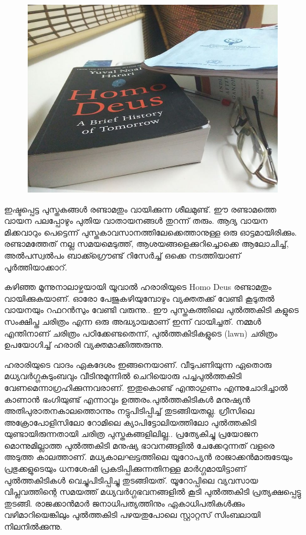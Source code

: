 \documentclass[10pt,a4paper]{report}
\begin{document}
   \begin{figure}[H]
  \center
\includegraphics[scale=.25]{images/harari}
\label{harari}
\caption{   }
\end{figure}
  ഇഷ്ടപ്പെട്ട പുസ്തകങ്ങള്‍ രണ്ടാമതും വായിക്കുന്ന ശീലമുണ്ട്. ഈ രണ്ടാമത്തെ വായന പലപ്പോഴും പുതിയ വാതായനങ്ങള്‍ തുറന്ന് തരും. ആദ്യ വായന മിക്കവാറും പെട്ടെന്ന് പുസ്തകാവസാനത്തിലേക്കെത്താനുള്ള ഒരു ഓട്ടമായിരിക്കും. രണ്ടാമത്തേത് നല്ല സമയമെടുത്ത്, ആശയങ്ങളെക്കുറിച്ചൊക്കെ ആലോചിച്ച്, അല്‍പസ്വല്‍പം ബാക്ക്ഗ്രൌണ്ട് റിസേര്‍ച്ച് ഒക്കെ നടത്തിയാണ് പൂര്‍ത്തിയാക്കാറ്. 
  
  കഴിഞ്ഞ മൂന്നുനാലാഴ്ചയായി യൂവാല്‍ ഹരാരിയുടെ Homo Deus രണ്ടാമതും വായിക്കുകയാണ്. ഓരോ പേജുകഴിയുമ്പോഴും വ്യക്തതക്ക് വേണ്ടി കൂടുതല്‍ വായനയും റഫറന്‍സും വേണ്ടി വരുന്നു.. ഈ പുസ്തകത്തിലെ പുൽത്തകിടി കളുടെ സംക്ഷിപ്ത ചരിത്രം എന്ന ഒരു അദ്ധ്യായമാണ് ഇന്ന് വായിച്ചത്. നമ്മള്‍ എന്തിനാണ് ചരിത്രം പഠിക്കേണ്ടതെന്ന്, പുല്‍ത്തകിടികളുടെ (lawn) ചരിത്രം ഉപയോഗിച്ച് ഹരാരി വ്യക്തമാക്കിത്തരുന്നു.
  
   ഹരാരിയുടെ വാദം ഏകദേശം ഇങ്ങനെയാണ്. വീടുപണിയുന്ന ഏതൊരു മധ്യവര്‍ഗ്ഗകുടുംബവും വീടിനുമുന്നില്‍ ചെറിയൊരു പച്ചപുല്‍ത്തകിടി വേണമെന്നാഗ്രഹിക്കുന്നവരാണ്. ഇതുകൊണ്ട് എന്താഗുണം എന്നുചോദിച്ചാൽ കാണാൻ ഭംഗിയുണ്ട് എന്നാവും ഉത്തരം.പുല്‍ത്തകിടികള്‍ മനുഷ്യന്‍ അതിപുരാതനകാലത്തൊന്നും നട്ടുപിടിപ്പിച്ച് തുടങ്ങിയതല്ല. ഗ്രീസിലെ അക്രോപോളിസിലോ റോമിലെ ക്യാപിട്ടോലിയത്തിലോ പുൽത്തകിടി യുണ്ടായിരുന്നതായി ചരിത്ര പുസ്തകങ്ങളിലില്ല.. പ്രത്യേകിച്ചു പ്രയോജന മൊന്നുമില്ലാത്ത പുൽത്തകിടി മനുഷ്യ ഭാവനങ്ങളിൽ ചേക്കേറുന്നത് വളരെ അടുത്ത കാലത്താണ്. മധ്യകാലഘട്ടത്തിലെ യൂറോപ്യന്‍ രാജാക്കന്‍മാരുടേയും പ്രഭുക്കളുടെയും ധനശേഷി പ്രകടിപ്പിക്കുന്നതിനള്ള മാര്‍ഗ്ഗമായിട്ടാണ് പുല്‍ത്തകിടികള്‍ വെച്ചുപിടിപ്പിച്ചു തുടങ്ങിയത്. യൂറോപ്പിലെ വ്യവസായ വിപ്ലവത്തിന്റെ സമയത്ത് മധ്യവര്‍ഗ്ഗഭവനങ്ങളില്‍ കൂടി പുല്‍ത്തകിടി പ്രത്യക്ഷപ്പെട്ടു തുടങ്ങി. രാജക്കാന്‍മാര്‍ ജനാധിപത്യത്തിനും ഏകാധിപതികള്‍ക്കും വഴിമാറിയെങ്കിലും പുല്‍ത്തകിടി പഴയതുപോലെ സ്റ്റാറ്റസ് സിംബലായി നിലനില്‍ക്കുന്നു. 
   
\end{document}
